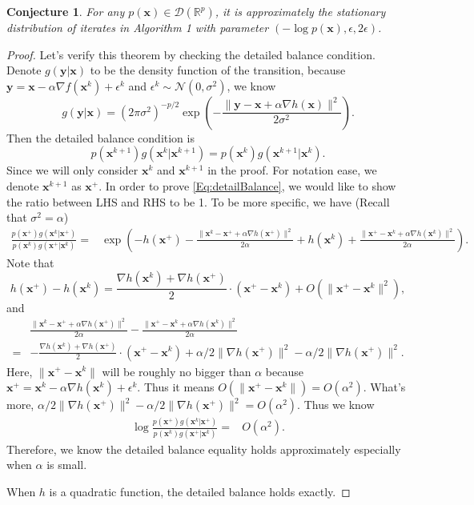 \documentclass[preprint,12pt,3p]{elsarticle}
\newcommand{\bx}{\mathbf{x}}
\newcommand{\R}{\mathbb{R}}
\newcommand{\D}{\mathscr{D}}
\newcommand{\N}{\mathscr{N}}
\newcommand{\by}{\mathbf{y}}
\newtheorem{conjecture}{Conjecture}
\begin{document}
\begin{conjecture}
For any $p(\bx)\in \D(\R^p)$, it is approximately the stationary distribution of iterates in Algorithm 1 with parameter $(-\log p(\bx), \epsilon, 2\epsilon)$.
\end{conjecture}
\begin{proof}
Let's verify this theorem by checking the detailed balance condition. Denote $g(\by|\bx)$ to be the density function of the transition, because $\by = \bx - \alpha \nabla f(\bx^k) + \epsilon^k$ and $\epsilon^k\sim \N(0, \sigma^2)$, we know
\begin{equation}
g(\by|\bx) = (2\pi \sigma^2)^{-p/2} \exp(- \frac{\|\by - \bx + \alpha \nabla h(\bx)\|^2}{2\sigma^2}).
\end{equation}
Then the detailed balance condition is
\begin{equation}\label{Eq:detailBalance}
p(\bx^{k+1}) g(\bx^{k}|\bx^{k+1}) = p(\bx^{k}) g(\bx^{k+1}|\bx^{k}).
\end{equation}
Since we will only consider $\bx^k$ and $\bx^{k+1}$ in the proof. For notation ease, we denote $\bx^{k+1}$ as $\bx^+$.
In order to prove \ref{Eq:detailBalance}, we would like to show the ratio between LHS and RHS to be 1. To be more specific, we have (Recall that $\sigma^2 = \alpha$)
\begin{eqnarray}
\frac{p(\bx^{+}) g(\bx^{k}|\bx^{+})}{p(\bx^{k}) g(\bx^{+}|\bx^{k})} = & \exp(-h(\bx^{+}) - \frac{\|\bx^{k} - \bx^+ + \alpha \nabla h(\bx^{+})\|^2}{2\alpha} + h(\bx^{k}) + \frac{\|\bx^{+} - \bx^k + \alpha \nabla h(\bx^k)\|^2}{2\alpha}).
\end{eqnarray}
Note that
\[h(\bx^+) - h(\bx^k) = \frac{\nabla h(\bx^k) + \nabla h(\bx^+)}{2} \cdot (\bx^+ - \bx^k) + O(\|\bx^+ - \bx^k\|^2),
\]
and
\begin{eqnarray}
 & \frac{\|\bx^{k} - \bx^+ + \alpha \nabla h(\bx^{+})\|^2}{2\alpha} - \frac{\|\bx^{+} - \bx^k + \alpha \nabla h(\bx^k)\|^2}{2\alpha} \\
 =& -\frac{\nabla h(\bx^k) + \nabla h(\bx^+)}{2} \cdot (\bx^+ - \bx^k) + \alpha/2 \|\nabla h(\bx^+)\|^2 - \alpha/2 \|\nabla h(\bx^+)\|^2.
\end{eqnarray}
Here, $\|\bx^+ - \bx^k\|$ will be roughly no bigger than $\alpha$ because $\bx^+ = \bx^k - \alpha \nabla h(\bx^k) + \epsilon^k$.  Thus it means $O(\|\bx^+ - \bx^k\|) = O(\alpha^2)$. What's more, $\alpha/2 \|\nabla h(\bx^+)\|^2 - \alpha/2 \|\nabla h(\bx^+)\|^2 = O(\alpha^2)$.
Thus we know
\begin{eqnarray}
\log \frac{p(\bx^{+}) g(\bx^{k}|\bx^{+})}{p(\bx^{k}) g(\bx^{+}|\bx^{k})} = &O(\alpha^2).
\end{eqnarray}
Therefore, we know the detailed balance equality holds approximately especially when $\alpha$ is small.

When $h$ is a quadratic function, the detailed balance holds exactly.
\end{proof}
\end{document}
